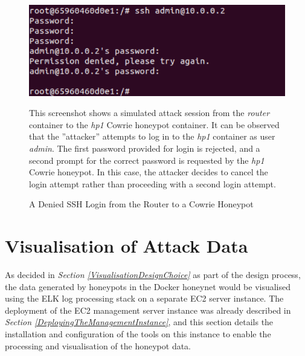 \begin{figure}[ht]
      \centering
      \includegraphics[width=160mm, scale=1]{Images/example-ssh-login-cowrie-container.PNG}
      \caption{A Denied SSH Login from the Router to a Cowrie Honeypot} 
      \medskip
      \small
		This screenshot shows a simulated attack session from the \textit{router }container to the \textit{hp1} Cowrie honeypot container. It can be observed that the ''attacker'' attempts to log in to  the \textit{hp1} container as user \textit{admin}. The first password provided for login is rejected, and a second prompt for the correct password is requested by the \textit{hp1} Cowrie honeypot. In this case, the attacker decides to cancel the login attempt rather than proceeding with a second login attempt.
\label{fig:cowrie-ssh-login-from-router}
\end{figure}


    

\section{Visualisation of Attack Data} \label{LoggingAndVisualisationSection}
As decided in \textit{Section \ref{VisualisationDesignChoice}} as part of the design process, the data generated by honeypots in the Docker honeynet would be visualised using the ELK log processing stack on a separate EC2 server instance. The deployment of the EC2 management server instance was already described in \textit{Section \ref{DeployingTheManagementInstance}}, and this section details the installation and configuration of the tools on this instance to enable the processing and visualisation of the honeypot data.

